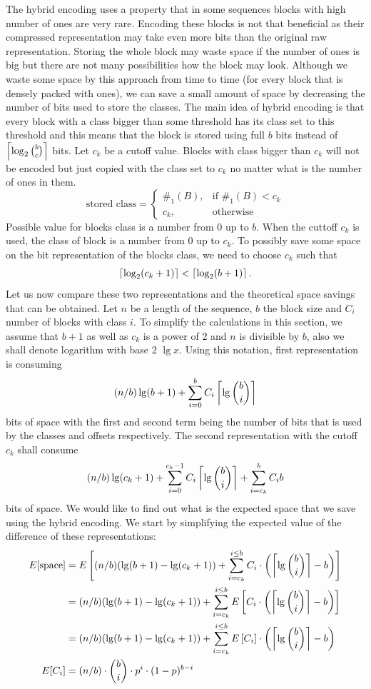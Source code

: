 The hybrid encoding uses a property that in some sequences blocks with high number
of ones are very rare. Encoding these blocks is not that beneficial as their
compressed representation may take even more bits than the original raw
representation. Storing the whole block may waste space if the number of
ones is big but there are not many possibilities how the block may look.
Although we waste some space by this approach from time to time (for every
block that is densely packed with ones), we can save a small amount of space
by decreasing the number of bits used to store the classes. The main idea
of hybrid encoding is that every block with a class bigger than some threshold
has its class set to this threshold and this means that the block
is stored using full $b$ bits instead of $\left\lceil \log_2{b\choose c} \right\rceil$ bits.
Let $c_k$ be a cutoff value. Blocks with class bigger than $c_k$ will not be
encoded but just copied with the class set to $c_k$ no matter what is the
number of ones in them.
\[
    \text{stored class} = 
\begin{cases}
    \#_1(B),& \text{if } \#_1(B) < c_k\\
    c_k,              & \text{otherwise}
\end{cases}
\]
Possible value for blocks class is a number from 0 up to $b$. When the cuttoff $c_k$ is
used, the class of block is a number from 0 up to $c_k$. To possibly save some space on
the bit representation of the blocks class, we need to choose $c_k$ such that
$$\left\lceil \log_2(c_k+1) \right\rceil < \left\lceil \log_2(b+1) \right\rceil.$$ Let us now compare these two representations
and the theoretical space savings that can be obtained. Let $n$ be a length of the
sequence, $b$ the block size and $C_i$ number of blocks with class $i$. To simplify the
calculations in this section, we assume that $b+1$ as well as $c_k$ is a power of 2 and
$n$ is divisible by $b$, also we shall denote logarithm with base 2 $\lg x$. Using this
notation, first representation is consuming
$$(n/b)\lg (b+1) + \sum_{i=0}^{b} C_i\left\lceil \lg {b\choose i} \right\rceil$$ bits of space with the
first and second term being the number of bits that is used by the classes and offsets
respectively. The second representation with the cutoff $c_k$ shall consume
$$(n/b)\lg (c_k+1) + \sum_{i=0}^{c_k-1}C_i\left\lceil \lg {b\choose i} \right\rceil + \sum_{i=c_k}^{b}C_i b$$
bits of space. We would like to find out what is the expected space that we save using the
hybrid encoding. We start by simplifying the expected value of the difference of these
representations:
\begin{align}
E[\text{space}] &= E\left[(n/b)(\lg(b+1)-\lg(c_k+1)) + \sum_{i=c_k}^{i\leq b}C_i\cdot \left(\left\lceil \lg{b\choose i} \right\rceil - b\right)\right] \nonumber\\
&=(n/b)(\lg(b+1)-\lg(c_k+1)) + \sum_{i=c_k}^{i\leq b}E\left[C_i\cdot \left(\left\lceil \lg{b\choose i} \right\rceil - b\right)\right] \nonumber\\
&=(n/b)(\lg(b+1)-\lg(c_k+1)) + \sum_{i=c_k}^{i\leq b}E\left[C_i\right]\cdot \left(\left\lceil \lg{b\choose i} \right\rceil - b\right) \nonumber\\
E[C_i] &= (n/b)\cdot {b\choose i}\cdot p^i\cdot (1-p)^{b-i} \label{eq:hybrid_encoding_expected_c_i}
\end{align}
